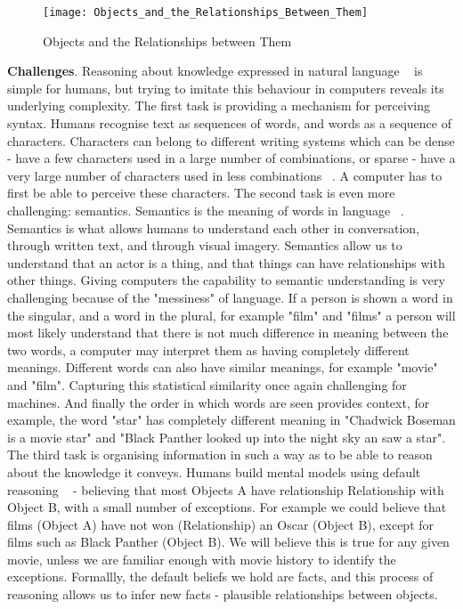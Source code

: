 \begin{figure}
  	\caption{Objects and the Relationships between Them}
   	\centering
    	\texttt{[image: Objects\_and\_the\_Relationships\_Between\_Them]}
\end{figure}

\textbf{Challenges}. Reasoning about knowledge expressed in natural language ~\citep{minervini2019differentiable} is simple for humans, but trying to imitate this behaviour in computers reveals its underlying complexity. \newline 
The first task is providing a mechanism for perceiving syntax. Humans recognise text as sequences of words, and words as a sequence of characters. Characters can belong to different writing systems which can be dense - have a few characters used in a large number of combinations, or sparse - have a very large number of characters used in less combinations ~\citep{Hua2010}. A computer has to first be able to perceive these characters. \newline
The second task is even more challenging: semantics. Semantics is the meaning of words in language ~\citep{chomsky1955logical}. Semantics is what allows humans to understand each other in conversation, through written text, and through visual imagery. Semantics allow us to understand that an actor is a thing, and that things can have relationships with other things. Giving computers the capability to semantic understanding is very challenging because of the "messiness" of language. If a person is shown a word in the singular, and a word in the plural, for example "film" and "films" a person will most likely understand that there is not much difference in meaning between the two words, a computer may interpret them as having completely different meanings. Different words can also have similar meanings, for example "movie" and "film". Capturing this statistical similarity once again challenging for machines. And finally the order in which words are seen provides context, for example, the word "star" has completely different meaning in "Chadwick Boseman is a movie star" and "Black Panther looked up into the night sky an saw a star". \newline
The third task is organising information in such a way as to be able to reason about the knowledge it conveys. Humans build mental models using default reasoning ~\citep{reiter1980logic} - believing that most Objects A have relationship Relationship with Object B, with a small number of exceptions. For example we could believe that films (Object A) have not won (Relationship) an Oscar (Object B), except for films such as Black Panther (Object B). We will believe this is true for any given movie, unless we are familiar enough with movie history to identify the exceptions. Formallly, the default beliefs we hold are facts, and this process of reasoning allows us to infer new facts - plausible relationships between objects. \newline
